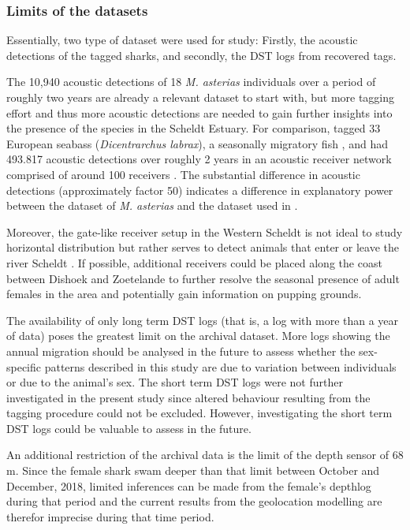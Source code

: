 \documentclass[
  authoryear,
  review,
  3p]{elsarticle}
\begin{document}
\hypertarget{limits-of-the-datasets}{%
\subsubsection{Limits of the datasets}\label{limits-of-the-datasets}}

Essentially, two type of dataset were used for study: Firstly, the
acoustic detections of the tagged sharks, and secondly, the DST logs
from recovered tags.

The 10,940 acoustic detections of 18 \emph{M. asterias} individuals over
a period of roughly two years are already a relevant dataset to start
with, but more tagging effort and thus more acoustic detections are
needed to gain further insights into the presence of the species in the
Scheldt Estuary. For comparison, \citet{hereu_2023} tagged 33 European
seabass (\emph{Dicentrarchus labrax}), a seasonally migratory fish
\citep{pawson_2007}, and had 493.817 acoustic detections over roughly 2
years in an acoustic receiver network comprised of around 100 receivers
\citep{aspillaga_2017}. The substantial difference in acoustic
detections (approximately factor 50) indicates a difference in
explanatory power between the dataset of \emph{M. asterias} and the
dataset used in \citet{hereu_2023}.

Moreover, the gate-like receiver setup in the Western Scheldt is not
ideal to study horizontal distribution but rather serves to detect
animals that enter or leave the river Scheldt \citep{reubens_2019}. If
possible, additional receivers could be placed along the coast between
Dishoek and Zoetelande to further resolve the seasonal presence of adult
females in the area and potentially gain information on pupping grounds.

The availability of only long term DST logs (that is, a log with more
than a year of data) poses the greatest limit on the archival dataset.
More logs showing the annual migration should be analysed in the future
to assess whether the sex-specific patterns described in this study are
due to variation between individuals or due to the animal's sex. The
short term DST logs were not further investigated in the present study
since altered behaviour resulting from the tagging procedure could not
be excluded. However, investigating the short term DST logs could be
valuable to assess in the future.

An additional restriction of the archival data is the limit of the depth
sensor of 68 m. Since the female shark swam deeper than that limit
between October and December, 2018, limited inferences can be made from
the female's depthlog during that period and the current results from
the geolocation modelling are therefor imprecise during that time
period.
\end{document}
